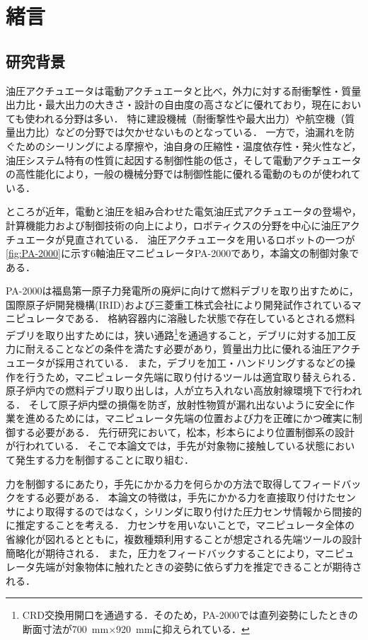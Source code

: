 \chapter{緒言}

\section{研究背景}
油圧アクチュエータは電動アクチュエータと比べ，外力に対する耐衝撃性・質量出力比・最大出力の大きさ・設計の自由度の高さなどに優れており，現在においても使われる分野は多い．
特に建設機械（耐衝撃性や最大出力）や航空機（質量出力比）などの分野では欠かせないものとなっている．
一方で，油漏れを防ぐためのシーリングによる摩擦や，油自身の圧縮性・温度依存性・発火性など，油圧システム特有の性質に起因する制御性能の低さ，そして電動アクチュエータの高性能化により，一般の機械分野では制御性能に優れる電動のものが使われている．

ところが近年，電動と油圧を組み合わせた電気油圧式アクチュエータの登場や，計算機能力および制御技術の向上により，ロボティクスの分野を中心に油圧アクチュエータが見直されている\cite{feng2014optimization,kuindersma2016optimization,玄相昊2015招待講演}．
油圧アクチュエータを用いるロボットの一つが\figname\ref{fig:PA-2000}に示す6軸油圧マニピュレータPA-2000\cite{IRID}であり，本論文の制御対象である．

PA-2000は福島第一原子力発電所の廃炉に向けて燃料デブリを取り出すために，国際原子炉開発機構(IRID)および三菱重工株式会社により開発試作されているマニピュレータである\cite{河西賢一2018福島第一原子力発電所燃料デブリ横取り出しに向けたロボット開発}．
格納容器内に溶融した状態で存在しているとされる燃料デブリを取り出すためには，狭い通路\footnote{CRD交換用開口を通過する．そのため，PA-2000では直列姿勢にしたときの断面寸法が\SI{700}{mm}$\times$\SI{920}{mm}に抑えられている．}を通過すること，デブリに対する加工反力に耐えることなどの条件を満たす必要があり，質量出力比に優れる油圧アクチュエータが採用されている．
また，デブリを加工・ハンドリングするなどの操作を行うため，マニピュレータ先端に取り付けるツールは適宜取り替えられる．
原子炉内での燃料デブリ取り出しは，人が立ち入れない高放射線環境下で行われる．
そして原子炉内壁の損傷を防ぎ，放射性物質が漏れ出ないように安全に作業を進めるためには，マニピュレータ先端の位置および力を正確にかつ確実に制御する必要がある．
先行研究において，松本，杉本らにより位置制御系の設計が行われている\cite{松本貴夢2016}．
そこで本論文では，手先が対象物に接触している状態において発生する力を制御することに取り組む．

力を制御するにあたり，手先にかかる力を何らかの方法で取得してフィードバックをする必要がある．
本論文の特徴は，手先にかかる力を直接取り付けたセンサにより取得するのではなく，シリンダに取り付けた圧力センサ情報から間接的に推定することを考える．
力センサを用いないことで，マニピュレータ全体の省線化が図れるとともに，複数種類利用することが想定される先端ツールの設計簡略化が期待される．
また，圧力をフィードバックすることにより，マニピュレータ先端が対象物体に触れたときの姿勢に依らず力を推定できることが期待される．

